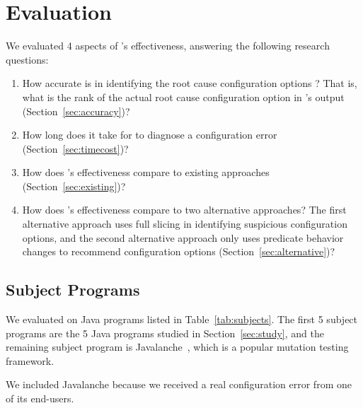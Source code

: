 
\section{Evaluation}
\label{sec:evaluation}

We evaluated 4 aspects of \ourtool's effectiveness, answering
the following research questions:

\vspace{-2mm}

\begin{enumerate}
\item How accurate is \ourtool in identifying the root
cause configuration options ? That is, what is the rank of the
actual root cause configuration option in \ourtool's output (Section~\ref{sec:accuracy})?

\item How long does it take for \ourtool to diagnose
a configuration error (Section~\ref{sec:timecost})?

\item How does \ourtool's effectiveness compare to
existing approaches (Section~\ref{sec:existing})?

\item How does \ourtool's effectiveness compare to
two alternative approaches? The first alternative approach
uses full slicing in identifying
suspicious configuration options, and the second alternative
approach only uses predicate behavior
changes to recommend configuration options (Section~\ref{sec:alternative})?

\end{enumerate}

\subsection{Subject Programs}

We evaluated \ourtool on \subjnum Java programs
listed in Table~\ref{tab:subjects}.
The first 5 subject programs are the 5 Java programs
studied in Section~\ref{sec:study},
and the remaining subject program is Javalanche~\cite{javalanche},
which is a popular mutation testing framework.

We included Javalanche because we received a real
configuration error from one of its end-users.

\newcommand{\randoopoptnum}{57\xspace}
\newcommand{\wekaoptnum}{14\xspace}
\newcommand{\synopticoptnum}{37\xspace}
\newcommand{\jchordoptnum}{79\xspace}
\newcommand{\jmeteroptnum}{55\xspace}
\newcommand{\javalancheoptnum}{35\xspace}

